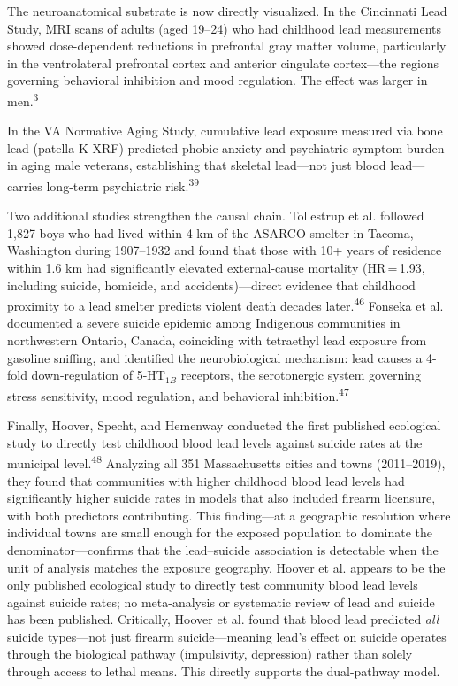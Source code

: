 \documentclass[11pt,twocolumn]{article}
\begin{document}
The neuroanatomical substrate is now directly visualized. In the Cincinnati Lead Study, MRI scans of adults (aged 19--24) who had childhood lead measurements showed dose-dependent reductions in prefrontal gray matter volume, particularly in the ventrolateral prefrontal cortex and anterior cingulate cortex---the regions governing behavioral inhibition and mood regulation. The effect was larger in men.\textsuperscript{3}

In the VA Normative Aging Study, cumulative lead exposure measured via bone lead (patella K-XRF) predicted phobic anxiety and psychiatric symptom burden in aging male veterans, establishing that skeletal lead---not just blood lead---carries long-term psychiatric risk.\textsuperscript{39}

Two additional studies strengthen the causal chain. Tollestrup et al. followed 1,827 boys who had lived within 4 km of the ASARCO smelter in Tacoma, Washington during 1907--1932 and found that those with 10+ years of residence within 1.6 km had significantly elevated external-cause mortality (HR\,=\,1.93, including suicide, homicide, and accidents)---direct evidence that childhood proximity to a lead smelter predicts violent death decades later.\textsuperscript{46} Fonseka et al. documented a severe suicide epidemic among Indigenous communities in northwestern Ontario, Canada, coinciding with tetraethyl lead exposure from gasoline sniffing, and identified the neurobiological mechanism: lead causes a 4-fold down-regulation of 5-HT$_{1B}$ receptors, the serotonergic system governing stress sensitivity, mood regulation, and behavioral inhibition.\textsuperscript{47}

Finally, Hoover, Specht, and Hemenway conducted the first published ecological study to directly test childhood blood lead levels against suicide rates at the municipal level.\textsuperscript{48} Analyzing all 351 Massachusetts cities and towns (2011--2019), they found that communities with higher childhood blood lead levels had significantly higher suicide rates in models that also included firearm licensure, with both predictors contributing. This finding---at a geographic resolution where individual towns are small enough for the exposed population to dominate the denominator---confirms that the lead--suicide association is detectable when the unit of analysis matches the exposure geography. Hoover et al. appears to be the only published ecological study to directly test community blood lead levels against suicide rates; no meta-analysis or systematic review of lead and suicide has been published. Critically, Hoover et al. found that blood lead predicted \textit{all} suicide types---not just firearm suicide---meaning lead's effect on suicide operates through the biological pathway (impulsivity, depression) rather than solely through access to lethal means. This directly supports the dual-pathway model.
\end{document}
